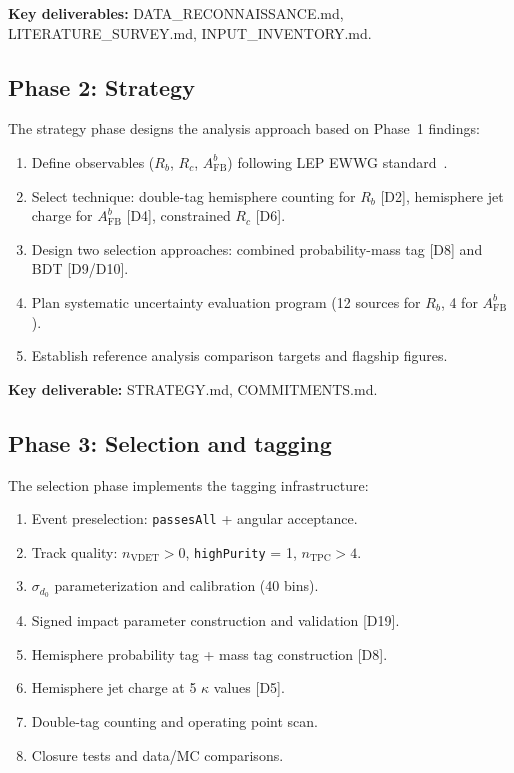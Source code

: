 \documentclass[11pt,a4paper]{article}
\begin{document}
\textbf{Key deliverables:} DATA\_RECONNAISSANCE.md, LITERATURE\_SURVEY.md, INPUT\_INVENTORY.md.

\subsection{Phase 2: Strategy}

The strategy phase designs the analysis approach based on Phase~1 findings:
\begin{enumerate}
\item Define observables ($R_b$, $R_c$, $A_\mathrm{FB}^b$) following LEP EWWG
standard~\cite{LEP:EWWG:2005}.
\item Select technique: double-tag hemisphere counting for $R_b$ [D2], hemisphere jet
charge for $A_\mathrm{FB}^b$ [D4], constrained $R_c$ [D6].
\item Design two selection approaches: combined probability-mass tag [D8] and BDT [D9/D10].
\item Plan systematic uncertainty evaluation program (12 sources for $R_b$, 4 for $A_\mathrm{FB}^b$).
\item Establish reference analysis comparison targets and flagship figures.
\end{enumerate}

\textbf{Key deliverable:} STRATEGY.md, COMMITMENTS.md.

\subsection{Phase 3: Selection and tagging}

The selection phase implements the tagging infrastructure:
\begin{enumerate}
\item Event preselection: \texttt{passesAll} + angular acceptance.
\item Track quality: $n_\mathrm{VDET} > 0$, \texttt{highPurity} = 1, $n_\mathrm{TPC} > 4$.
\item $\sigma_{d_0}$ parameterization and calibration (40 bins).
\item Signed impact parameter construction and validation [D19].
\item Hemisphere probability tag + mass tag construction [D8].
\item Hemisphere jet charge at 5 $\kappa$ values [D5].
\item Double-tag counting and operating point scan.
\item Closure tests and data/MC comparisons.
\end{enumerate}
\end{document}
